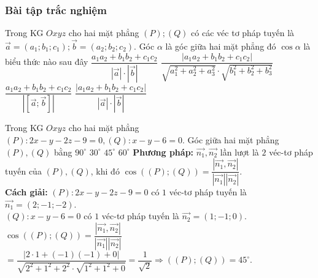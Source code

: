 \subsubsection{Bài tập trắc nghiệm}
\begin{ex}%
	Trong KG $Oxyz$ cho hai mặt phẳng $(P); (Q)$ có các véc tơ pháp tuyến là $\vec{a}=\left(a_1; b_1; c_1\right);\vec{b}=\left(a_2; b_2; c_2\right)$. Góc $\alpha $ là góc giữa hai mặt phẳng đó $\cos\alpha $ là biểu thức nào sau đây
	\choice
	{$\dfrac{a_1a_2+b_1b_2+c_1c_2}{\left|{\vec{a}}\right|\cdot\left|{\vec{b}}\right|}$}
	{$\dfrac{\left|{a_1a_2+b_1b_2+c_1c_2}\right|}{\sqrt{a_1^2+a_2^2+a_3^2}\cdot\sqrt{b_1^2+b_2^2+b_3^2}}$}
	{$\dfrac{a_1a_2+b_1b_2+c_1c_2}{\left|{\left[{\vec{a};\vec{b}}\right]}\right|}$}
	{\True $\dfrac{\left|{a_1a_2+b_1b_2+c_1c_2}\right|}{\left|{\vec{a}}\right|\cdot\left|{\vec{b}}\right|}$}
\end{ex}
\begin{ex}%
	Trong KG $Oxyz$  cho hai mặt phẳng $(P)\colon 2x - y-2z-9=0, (Q)\colon  x - y - 6=0$.    Góc giữa hai mặt phẳng  $(P), (Q)$ bằng
	\choice
	{$90^\circ$}
	{$30^\circ$}
	{\True $45^\circ$}
	{$60^\circ$}
	\loigiai
	{{\bfseries Phương pháp:}
		$\overrightarrow{n_1}, \overrightarrow{n_2}$  lần lượt là $2$ véc-tơ pháp tuyến của $(P), (Q)$, khi đó
		$\cos \left(\left( P \right);\left( Q \right)\right) = \dfrac{\left|\overrightarrow{n_1} ,\overrightarrow{n_2}\right|}{\left|\overrightarrow{n_1}\right|\left|\overrightarrow{n_2}\right|}$.\\
		{\bfseries Cách giải:}
		$(P)\colon 2x - y-2z-9=0$ có $1$ véc-tơ pháp tuyến là $\overrightarrow{n_1} = (2;-1;-2)$.\\
		$(Q)\colon  x - y - 6=0$ có $1$ véc-tơ pháp tuyến là $\overrightarrow{n_2} = (1;-1;0)$.\\
		$\cos \left(\left( P \right);\left( Q \right)\right) = \dfrac{\left|\overrightarrow{n_1}, \overrightarrow{n_2}\right|}{\left|\overrightarrow{n_1}\right|\left|\overrightarrow{n_2}\right|} $
		$= \dfrac{\left|2\cdot 1 + \left(- 1\right)\left(- 1\right) + 0\right|}{\sqrt{2^2 + 1^2 + 2^2}\cdot \sqrt{1^2+ 1^2 + 0}}= \dfrac{1}{\sqrt{2}} \Rightarrow \left(\left( P \right);\left( Q \right)\right) = 45^\circ$.
	}
\end{ex}

